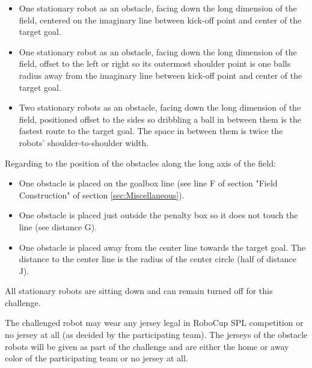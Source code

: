 \begin{itemize}
	\item One stationary robot as an obstacle, facing down the long dimension of the field, centered on the imaginary line between kick-off point and center of the target goal.
	\item One stationary robot as an obstacle, facing down the long dimension of the field, offset to the left or right so its outermost shoulder point is one balls radius away from the imaginary line between kick-off point and center of the target goal. %
	\item Two stationary robots as an obstacle, facing down the long dimension of the field, positioned offset to the sides so dribbling a ball in between them is the fastest route to the target goal. The space in between them is twice the robots' shoulder-to-shoulder width. %
\end{itemize}

Regarding to the position of the obstacles along the long axis of the field:

\begin{itemize}
	\item One obstacle is placed on the goalbox line (see line F of section "Field Construction" of section \ref{sec:Miscellaneous}).
	\item One obstacle is placed just outside the penalty box so it does not touch the line (see distance  G).
	\item One obstacle is placed away from the center line towards the target goal. The distance to the center line is the radius of the center circle (half of distance J).
\end{itemize}

All stationary robots are sitting down and can remain turned off for this challenge.

The challenged robot may wear any jersey legal in RoboCup SPL competition or no jersey at all (as decided by the participating team). The jerseys of the obstacle robots will be given as part of the challenge and are either the home or away color of the participating team or no jersey at all.

